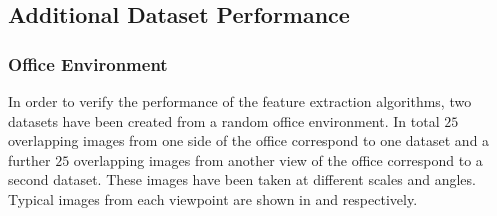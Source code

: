 \documentclass{article}
\begin{document}
\subsection{Additional Dataset Performance}
\label{sec:additionalDataset}

\subsubsection{Office Environment}
\label{sec:office}

In order to verify the performance of the feature extraction algorithms, two datasets have been created from a random office environment. In total $25$ overlapping images from one side of the office correspond to one dataset and a further $25$ overlapping images from another view of the office correspond to a second dataset. These images have been taken at different scales and angles. Typical images from each viewpoint are shown in  and  respectively.\\
\end{document}
